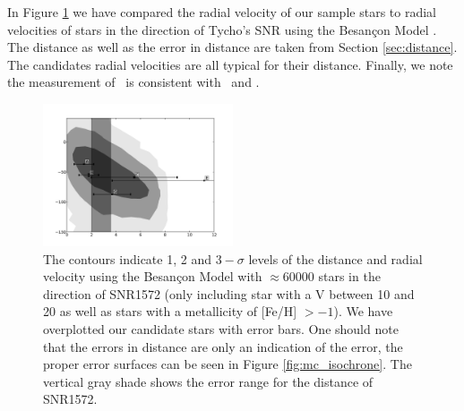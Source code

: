 In Figure \ref{fig:dist_vr} we have compared the radial velocity of our sample stars to radial velocities of stars in the direction of Tycho's SNR using the Besan\c{c}on Model \citep{2003A&A...409..523R}. The distance as well as the error in distance are taken from Section \ref{sec:distance}.  The candidates radial velocities are all typical for their distance. Finally, we note the measurement of \starg\ is consistent with \wek\ and \gh.


\begin{figure}[htbp] %
   \centering
   \includegraphics[width=0.5\textwidth]{chapter_sn1572_hires/plots/dist_vr.pdf} 
   \caption[Radial velocity of all candidate stars in SN 1572 with the Besan\c{c}on Model]{The contours indicate 1, 2 and $3-\sigma$ levels of the distance and radial velocity using the Besan\c{c}on Model \citep{2003A&A...409..523R} with $\approx 60 000$ stars in the direction of SNR1572 (only including star with a V between 10 and 20 as well as stars with a metallicity of [Fe/H] $> -1$). We have overplotted our candidate stars with error bars. One should note that the errors in distance are only an indication of the error, the proper error surfaces can be seen in Figure \ref{fig:mc_isochrone}. The vertical gray shade shows the error range for the distance of SNR1572.}
   \label{fig:dist_vr}
\end{figure}



